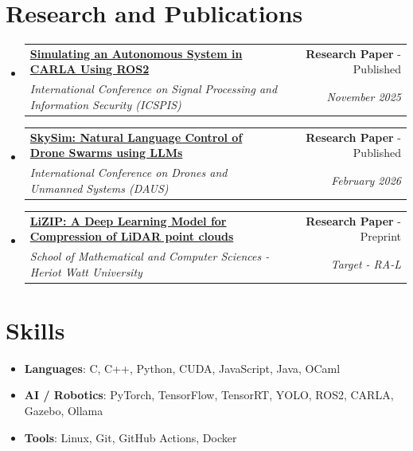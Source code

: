 \documentclass[a4paper,20pt]{article}
\makeatletter
\newcommand{\resumeItem}[2] {
	\item\small{
		\textbf{#1}{: #2 \vspace{-2pt}}
	}
}
\newcommand{\resumeSubheading}[4] {
	\vspace{-1pt}\item
	\begin{tabular*}{0.97\textwidth}{l@{\extracolsep{\fill}}r}
		\textbf{#1} & #2 \\
		\textit{#3} & \textit{#4} \\
	\end{tabular*}\vspace{-5pt}
}
\newcommand{\resumeSubItem}[2]{\resumeItem{#1}{#2}\vspace{-3pt}}
\newcommand{\resumeSubHeadingListStart}{\begin{itemize}[leftmargin=*]}
\newcommand{\resumeSubHeadingListEnd}{\end{itemize}}
\makeatother
\begin{document}
\section{Research and Publications}
	\resumeSubHeadingListStart
        \resumeSubheading
		{\href{https://ieeexplore.ieee.org/document/11318365}{Simulating an Autonomous System in CARLA Using ROS2}}
		{\textbf{Research Paper} - Published} 
		{International Conference on Signal Processing and Information Security (ICSPIS)}{November 2025}
		\resumeSubheading
		{\href{https://sensorsportal.com/DOWNLOADS/DAUS_2026_Proceedings.pdf}{SkySim: Natural Language Control of Drone Swarms using LLMs}}
		{\textbf{Research Paper} - Published} 
		{International Conference on Drones and Unmanned Systems (DAUS)}{February 2026}
		\resumeSubheading
		{\href{https://arxiv.org/abs/2603.23162}{LiZIP: A Deep Learning Model for Compression of LiDAR point clouds}}
		{\textbf{Research Paper} - Preprint} 
		{School of Mathematical and Computer Sciences - Heriot Watt University}{Target - RA-L}
	\resumeSubHeadingListEnd

\vspace{1pt}

\section{Skills}
    \resumeSubHeadingListStart
        \resumeSubItem{Languages}{C, C++, Python, CUDA, JavaScript, Java, OCaml}
        \resumeSubItem{AI / Robotics}{PyTorch, TensorFlow, TensorRT, YOLO, ROS2, CARLA, Gazebo, Ollama}
        \resumeSubItem{Tools}{Linux, Git, GitHub Actions, Docker}
    \resumeSubHeadingListEnd

\vspace{1pt}
\end{document}
